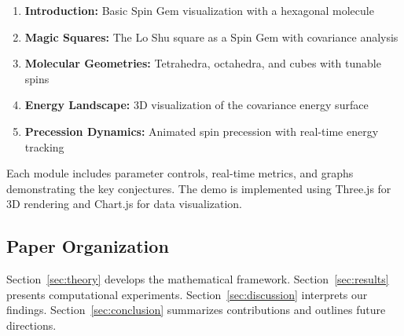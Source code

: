 \begin{enumerate}
    \item \textbf{Introduction:} Basic Spin Gem visualization with a hexagonal molecule
    \item \textbf{Magic Squares:} The Lo Shu square as a Spin Gem with covariance analysis
    \item \textbf{Molecular Geometries:} Tetrahedra, octahedra, and cubes with tunable spins
    \item \textbf{Energy Landscape:} 3D visualization of the covariance energy surface
    \item \textbf{Precession Dynamics:} Animated spin precession with real-time energy tracking
\end{enumerate}

Each module includes parameter controls, real-time metrics, and graphs demonstrating the key conjectures. The demo is implemented using Three.js for 3D rendering and Chart.js for data visualization.

\subsection{Paper Organization}

Section~\ref{sec:theory} develops the mathematical framework. Section~\ref{sec:results} presents computational experiments. Section~\ref{sec:discussion} interprets our findings. Section~\ref{sec:conclusion} summarizes contributions and outlines future directions.
